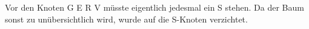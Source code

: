 \documentclass{lehramt-informatik-aufgabe}
\begin{document}
\begin{enumerate}
\begin{liAntwort}

Vor den Knoten G E R V müsste eigentlich jedesmal ein S stehen. Da der
Baum sonst zu unübersichtlich wird, wurde auf die S-Knoten verzichtet.

\begin{center}
\end{center}
\end{liAntwort}

\end{enumerate}
\end{document}
